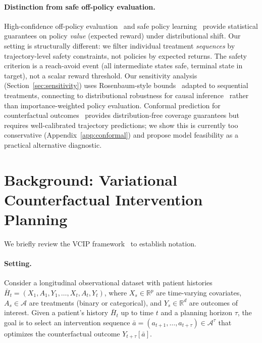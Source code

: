 \documentclass{article}
\newcommand{\R}{\mathbb{R}}
\newcommand{\bH}{\bar{H}}
\newcommand{\ba}{\bar{a}}
\newcommand{\cA}{\mathcal{A}}
\begin{document}
\paragraph{Distinction from safe off-policy evaluation.} High-confidence off-policy evaluation~\citep{thomas2015high, thomas2016data} and safe policy learning~\citep{kallus2018policy} provide statistical guarantees on policy \emph{value} (expected reward) under distributional shift. Our setting is structurally different: we filter individual treatment \emph{sequences} by trajectory-level safety constraints, not policies by expected returns. The safety criterion is a reach-avoid event (all intermediate states safe, terminal state in target), not a scalar reward threshold. Our sensitivity analysis (Section~\ref{sec:sensitivity}) uses Rosenbaum-style bounds~\citep{rosenbaum2002observational} adapted to sequential treatments, connecting to distributional robustness for causal inference~\citep{kallus2021minimax, yadlowsky2022bounds} rather than importance-weighted policy evaluation. Conformal prediction for counterfactual outcomes~\citep{lei2021conformal} provides distribution-free coverage guarantees but requires well-calibrated trajectory predictions; we show this is currently too conservative (Appendix~\ref{app:conformal}) and propose model feasibility as a practical alternative diagnostic.


\section{Background: Variational Counterfactual Intervention Planning}
\label{sec:background}

We briefly review the VCIP framework~\citep{melnychuk2025vcip} to establish notation.

\vspace{-0.8em}
\paragraph{Setting.} Consider a longitudinal observational dataset with patient histories $\bH_t = (X_1, A_1, Y_1, \ldots, X_t, A_t, Y_t)$, where $X_s \in \R^p$ are time-varying covariates, $A_s \in \cA$ are treatments (binary or categorical), and $Y_s \in \R^d$ are outcomes of interest. Given a patient's history $\bH_t$ up to time $t$ and a planning horizon $\tau$, the goal is to select an intervention sequence $\ba = (a_{t+1}, \ldots, a_{t+\tau}) \in \cA^\tau$ that optimizes the counterfactual outcome $Y_{t+\tau}[\ba]$.
\end{document}
